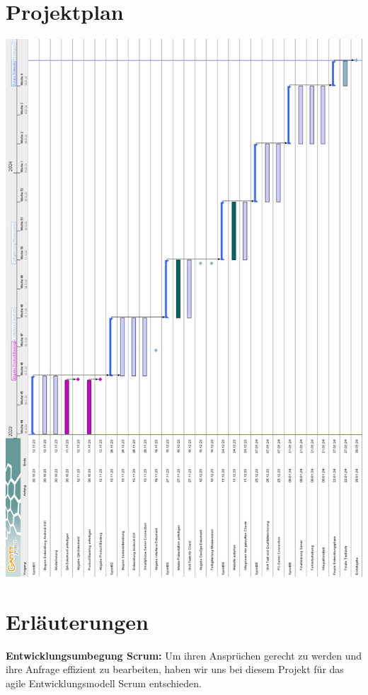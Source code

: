 \documentclass[11pt]{article}
\begin{document}

\clearpage
\tableofcontents
\thispagestyle{empty}
\section{Projektplan}
\includegraphics[scale=0.37]{images/Projektplan_DOG_1_Test.png}
\setcounter{page}{1}
\section{Erläuterungen}
\textbf{Entwicklungsumbegung Scrum:}
Um ihren Ansprüchen gerecht zu werden und ihre Anfrage effizient zu bearbeiten, haben wir uns bei diesem Projekt für das agile Entwicklungsmodell Scrum entschieden. \\
\end{document}
